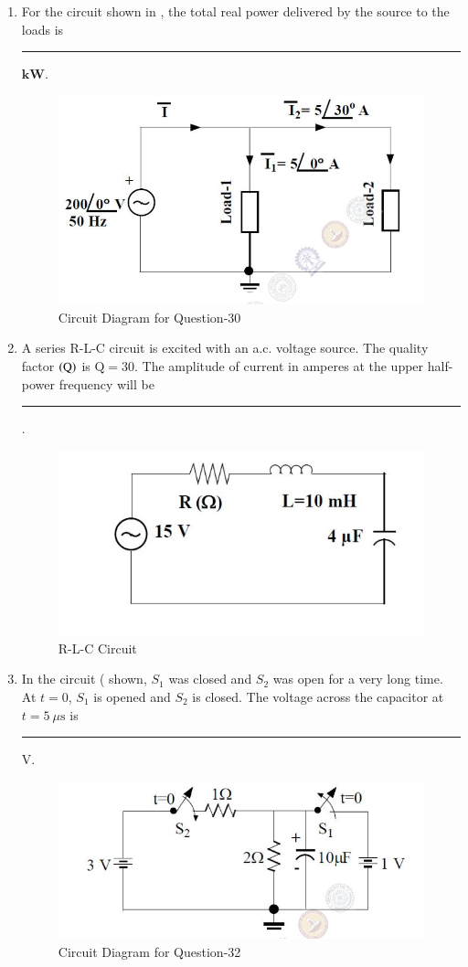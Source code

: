 \documentclass[journal,12pt,onecolumn]{IEEEtran}
\theoremstyle{remark}
\begin{document}
\begin{enumerate}
\item For the circuit shown in , the total real power delivered by the source to the loads is \rule{1.5cm}{0.4pt} $\textbf{kW}$. \par \hfill{}
\begin{figure}[H]
    \centering
    \includegraphics[width=0.5\columnwidth]{Figs/Q-30.png}
    \caption{Circuit Diagram for Question-30}
    \label{fig:placeholder_12}
\end{figure}


\item A series R-L-C circuit is excited with an a.c. voltage source. The quality factor $\left(\text{Q}\right)$ is $\text{Q} = 30$. The amplitude of current in amperes at the upper half-power frequency will be \rule{1.5cm}{0.4pt}. \par \hfill{}
\begin{figure}[H]
    \centering
    \includegraphics[width=0.5\columnwidth]{Figs/Q-31.png}
    \caption{R-L-C Circuit}
    \label{fig:placeholder_13}
\end{figure}

\item In the circuit ( shown, $S_1$ was closed and $S_2$ was open for a very long time. At $t=0$, $S_1$ is opened and $S_2$ is closed. The voltage across the capacitor at $t = 5 \ \mu\text{s}$ is \rule{1.5cm}{0.4pt} $\text{V}$. \par \hfill{}
\begin{figure}[H]
    \centering
    \includegraphics[width=0.6\columnwidth]{Figs/Q-32.png}
    \caption{Circuit Diagram for Question-32}
    \label{fig:placeholder_14}
\end{figure}


\end{enumerate}
\end{document}

